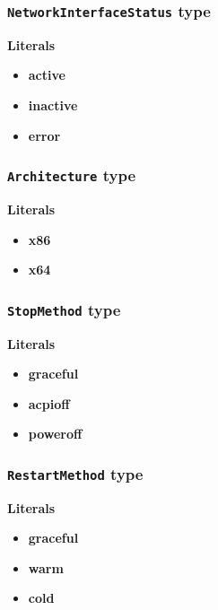 \subsubsection{\texttt{NetworkInterfaceStatus} type}

\textbf{Literals}
\begin{itemize}
\item \textbf{active} 
\end{itemize}
\begin{itemize}
\item \textbf{inactive} 
\end{itemize}
\begin{itemize}
\item \textbf{error} 
\end{itemize}

\subsubsection{\texttt{Architecture} type}

\textbf{Literals}
\begin{itemize}
\item \textbf{x86} 
\end{itemize}
\begin{itemize}
\item \textbf{x64} 
\end{itemize}

\subsubsection{\texttt{StopMethod} type}

\textbf{Literals}
\begin{itemize}
\item \textbf{graceful} 
\end{itemize}
\begin{itemize}
\item \textbf{acpioff} 
\end{itemize}
\begin{itemize}
\item \textbf{poweroff} 
\end{itemize}

\subsubsection{\texttt{RestartMethod} type}

\textbf{Literals}
\begin{itemize}
\item \textbf{graceful} 
\end{itemize}
\begin{itemize}
\item \textbf{warm} 
\end{itemize}
\begin{itemize}
\item \textbf{cold} 
\end{itemize}

